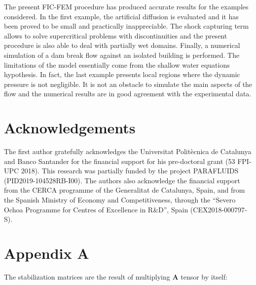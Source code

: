 \documentclass[a4paper,12pt]{elsarticle}
\begin{document}
The present FIC-FEM procedure has produced accurate results for the examples considered.
In the first example, the artificial diffusion is evaluated and it has been proved to be small and practically inappreciable. The shock capturing term allows to solve supercritical problems with discontinuities and the present procedure is also able to deal with partially wet domains. Finally, a numerical simulation of a dam break flow against an isolated building is performed.%
The limitations of the model essentially come from the shallow water equations hypothesis. In fact, the last example presents local regions where the dynamic pressure is not negligible. It is not an obstacle to simulate the main aspects of the flow and the numerical results are in good agreement with the experimental data.



\section{Acknowledgements}

The first author gratefully acknowledges the Universitat Politècnica de Catalunya and Banco Santander for the financial support for his pre-doctoral grant (53 FPI-UPC 2018).
This research was partially funded by the project PARAFLUIDS (PID2019-104528RB-I00). The authors also acknowledge the financial support from the CERCA programme of the Generalitat de Catalunya, Spain, and from the Spanish Ministry of Economy and Competitiveness, through the “Severo Ochoa Programme for Centres of Excellence in R\&D”, Spain (CEX2018-000797-S).



\section*{Appendix A}

The stabilization matrices are the result of multiplying $\mathbf{A}$ tensor by itself:
\end{document}
